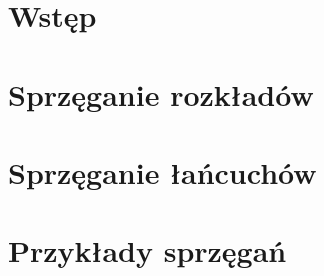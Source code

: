 \section{Wstęp}


\newpage
\section{Sprzęganie rozkładów}


\newpage
\section{Sprzęganie łańcuchów}


\newpage
\section{Przykłady sprzęgań}

